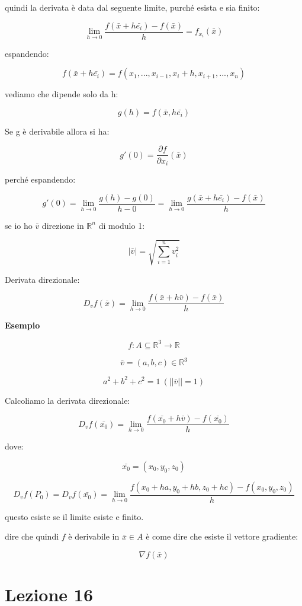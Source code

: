 \documentclass[11pt]{article}
\begin{document}
quindi la derivata è data dal seguente limite, purché esista e sia finito:

\[
\lim_{ h \to 0 } \frac{f(\bar{x} + h \bar{e_i}) - f(\bar{x} )}{h} = f_{x_i}(\bar{x} )
\]

espandendo:

\[
    f( \bar{x} +h \bar{e_i} ) = f( x_1,...,x_{i-1},x_i+h , x_{i+1},...,x_n)
\]

vediamo che dipende solo da h:

\[
    g(h) = f(\bar{x} ,h \bar{e_i} )
\]

Se g è derivabile allora si ha:

\[
    g'(0) = \frac{\partial f}{\partial x_i}(\bar{x} )
\]

perché espandendo:

\[
    g'(0) = \lim_{ h \to 0 } \frac{g(h) - g(0)}{h-0} = \lim_{ h \to 0 } \frac{g(\bar{x} +h \bar{e_i} ) - f(\bar{x} )}{h}
\]

se io ho $\bar{v} $ direzione in $\mathbb{R}^{n}$ di modulo 1:

\[
    |\bar{v} | = \sqrt{\sum^{n}_{i=1} v_i^{2}}
\]

Derivata direzionale:

\[
    D_v f(\bar{x} ) = \lim_{ h \to 0 } \frac{f(\bar{x} +h \bar{v} ) -f(\bar{x} )}{h}
\]


\textbf{Esempio} 

\[
    f: A \subseteq \mathbb{R}^{3} \rightarrow  \mathbb{R}
\]

\[
    \bar{v} = (a,b,c) \in \mathbb{R}^{3}
\]

\[
    a^{2}+b^{2}+c^{2}= 1\ (||\bar{v} || =1)
\]

Calcoliamo la derivata direzionale:

\[
    D_v f(\bar{x_0} ) = \lim_{ h \to 0 } \frac{f(\bar{x_0} + h \bar{v} ) -f(\bar{x_0} )}{h}
\]

dove:

\[
    \bar{x_0} = (x_0,y_0,z_0)
\]

\[
    D_v f(P_0) = D_v f(\bar{x_0} ) = \lim_{ h \to 0 } \frac{f(x_0+ha,y_0+hb,z_0+hc) - f(x_0,y_0,z_0)}{h}
\]

questo esiste se il limite esiste e finito.

dire che quindi $f$ è derivabile in $\bar{x} \in A$ è come dire che esiste il vettore gradiente:

\[
   \nabla f(\bar{x} ) 
\]

\section{Lezione 16}
\end{document}
